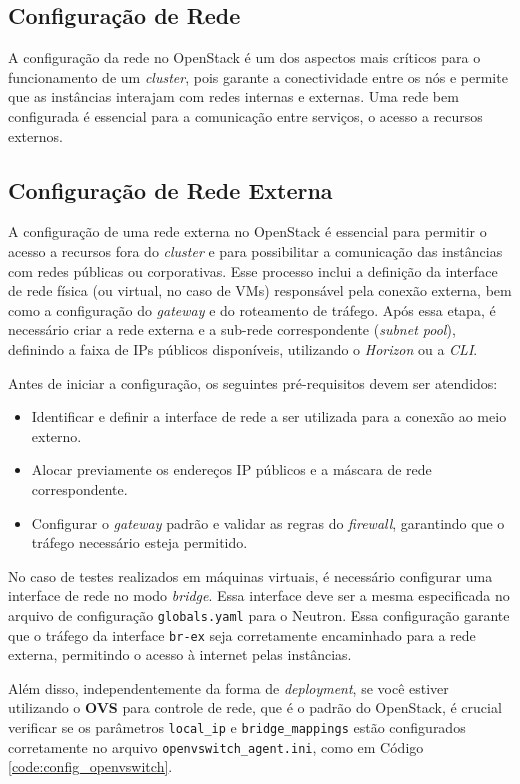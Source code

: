 \subsection{Configuração de Rede}
A configuração da rede no OpenStack é um dos aspectos mais críticos para o funcionamento de um \textit{cluster}, pois garante a conectividade entre os nós e permite que as instâncias interajam com redes internas e externas. Uma rede bem configurada é essencial para a comunicação entre serviços, o acesso a recursos externos.

\subsection{Configuração de Rede Externa}
A configuração de uma rede externa no OpenStack é essencial para permitir o acesso a recursos fora do \textit{cluster} e para possibilitar a comunicação das instâncias com redes públicas ou corporativas. Esse processo inclui a definição da interface de rede física (ou virtual, no caso de VMs) responsável pela conexão externa, bem como a configuração do \textit{gateway} e do roteamento de tráfego. Após essa etapa, é necessário criar a rede externa e a sub-rede correspondente (\textit{subnet pool}), definindo a faixa de IPs públicos disponíveis, utilizando o \textit{Horizon} ou a \textit{CLI}.

Antes de iniciar a configuração, os seguintes pré-requisitos devem ser atendidos:
\begin{itemize}
    \item Identificar e definir a interface de rede a ser utilizada para a conexão ao meio externo.
    \item Alocar previamente os endereços IP públicos e a máscara de rede correspondente.
    \item Configurar o \textit{gateway} padrão e validar as regras do \textit{firewall}, garantindo que o tráfego necessário esteja permitido.
\end{itemize}

No caso de testes realizados em máquinas virtuais, é necessário configurar uma interface de rede no modo \textit{bridge}. Essa interface deve ser a mesma especificada no arquivo de configuração \texttt{globals.yaml} para o Neutron. Essa configuração garante que o tráfego da interface \texttt{br-ex} seja corretamente encaminhado para a rede externa, permitindo o acesso à internet pelas instâncias. 

Além disso, independentemente da forma de \textit{deployment}, se você estiver utilizando o \textbf{OVS} para controle de rede, que é o padrão do OpenStack, é crucial verificar se os parâmetros \texttt{local\_ip} e \texttt{bridge\_mappings} estão configurados corretamente no arquivo \texttt{openvswitch\_agent.ini}, como em Código \ref{code:config_openvswitch}.


